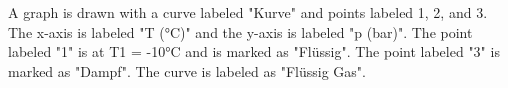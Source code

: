 A graph is drawn with a curve labeled "Kurve" and points labeled 1, 2, and 3. The x-axis is labeled "T (°C)" and the y-axis is labeled "p (bar)". The point labeled "1" is at T1 = -10°C and is marked as "Flüssig". The point labeled "3" is marked as "Dampf". The curve is labeled as "Flüssig Gas".